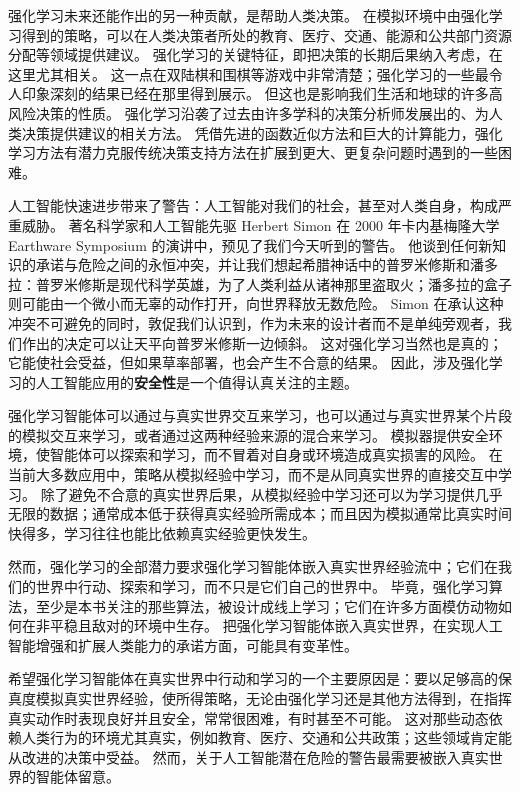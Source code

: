\documentclass[UTF8, 12pt, fontset=fandol, oneside]{ctexart}
\begin{document}
强化学习未来还能作出的另一种贡献，是帮助人类决策。
在模拟环境中由强化学习得到的策略，可以在人类决策者所处的教育、医疗、交通、能源和公共部门资源分配等领域提供建议。
强化学习的关键特征，即把决策的长期后果纳入考虑，在这里尤其相关。
这一点在双陆棋和围棋等游戏中非常清楚；强化学习的一些最令人印象深刻的结果已经在那里得到展示。
但这也是影响我们生活和地球的许多高风险决策的性质。
强化学习沿袭了过去由许多学科的决策分析师发展出的、为人类决策提供建议的相关方法。
凭借先进的函数近似方法和巨大的计算能力，强化学习方法有潜力克服传统决策支持方法在扩展到更大、更复杂问题时遇到的一些困难。

人工智能快速进步带来了警告：人工智能对我们的社会，甚至对人类自身，构成严重威胁。
著名科学家和人工智能先驱 Herbert Simon 在 2000 年卡内基梅隆大学 Earthware Symposium 的演讲中，预见了我们今天听到的警告。
他谈到任何新知识的承诺与危险之间的永恒冲突，并让我们想起希腊神话中的普罗米修斯和潘多拉：普罗米修斯是现代科学英雄，为了人类利益从诸神那里盗取火；潘多拉的盒子则可能由一个微小而无辜的动作打开，向世界释放无数危险。
Simon 在承认这种冲突不可避免的同时，敦促我们认识到，作为未来的设计者而不是单纯旁观者，我们作出的决定可以让天平向普罗米修斯一边倾斜。
这对强化学习当然也是真的；它能使社会受益，但如果草率部署，也会产生不合意的结果。
因此，涉及强化学习的人工智能应用的\textbf{安全性}是一个值得认真关注的主题。

强化学习智能体可以通过与真实世界交互来学习，也可以通过与真实世界某个片段的模拟交互来学习，或者通过这两种经验来源的混合来学习。
模拟器提供安全环境，使智能体可以探索和学习，而不冒着对自身或环境造成真实损害的风险。
在当前大多数应用中，策略从模拟经验中学习，而不是从同真实世界的直接交互中学习。
除了避免不合意的真实世界后果，从模拟经验中学习还可以为学习提供几乎无限的数据；通常成本低于获得真实经验所需成本；而且因为模拟通常比真实时间快得多，学习往往也能比依赖真实经验更快发生。

然而，强化学习的全部潜力要求强化学习智能体嵌入真实世界经验流中；它们在我们的世界中行动、探索和学习，而不只是它们自己的世界中。
毕竟，强化学习算法，至少是本书关注的那些算法，被设计成线上学习；它们在许多方面模仿动物如何在非平稳且敌对的环境中生存。
把强化学习智能体嵌入真实世界，在实现人工智能增强和扩展人类能力的承诺方面，可能具有变革性。

希望强化学习智能体在真实世界中行动和学习的一个主要原因是：要以足够高的保真度模拟真实世界经验，使所得策略，无论由强化学习还是其他方法得到，在指挥真实动作时表现良好并且安全，常常很困难，有时甚至不可能。
这对那些动态依赖人类行为的环境尤其真实，例如教育、医疗、交通和公共政策；这些领域肯定能从改进的决策中受益。
然而，关于人工智能潜在危险的警告最需要被嵌入真实世界的智能体留意。
\end{document}
